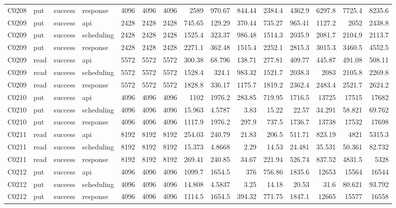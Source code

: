 \begin{landscape}
\begin{longtable}{llllrrrrrrrrrrr}
C0208 & put & success & response & 4096 & 4096 & 4096 & 2589 & 970.67 & 844.44 & 2384.4 & 4362.9 & 6297.8 & 7725.4 & 8235.6\\
C0209 & put & success & api & 2428 & 2428 & 2428 & 745.65 & 129.29 & 370.44 & 735.27 & 965.41 & 1127.2 & 2052 & 2438.8\\
C0209 & put & success & scheduling & 2428 & 2428 & 2428 & 1525.4 & 323.37 & 986.48 & 1514.3 & 2035.9 & 2081.7 & 2104.9 & 2113.7\\
C0209 & put & success & response & 2428 & 2428 & 2428 & 2271.1 & 362.48 & 1515.4 & 2252.1 & 2815.3 & 3015.3 & 3460.5 & 4552.5\\
C0209 & read & success & api & 5572 & 5572 & 5572 & 300.38 & 68.796 & 138.71 & 277.81 & 409.77 & 445.87 & 491.08 & 508.11\\
C0209 & read & success & scheduling & 5572 & 5572 & 5572 & 1528.4 & 324.1 & 983.32 & 1521.7 & 2038.3 & 2083 & 2105.8 & 2269.8\\
C0209 & read & success & response & 5572 & 5572 & 5572 & 1828.8 & 336.17 & 1175.7 & 1819.2 & 2362.4 & 2483.4 & 2521.7 & 2624.2\\
C0210 & put & success & api & 4096 & 4096 & 4096 & 1102 & 1976.2 & 283.85 & 719.95 & 1716.5 & 13725 & 17515 & 17682\\
C0210 & put & success & scheduling & 4096 & 4096 & 4096 & 15.963 & 4.5787 & 3.83 & 15.22 & 22.57 & 34.291 & 58.821 & 69.762\\
C0210 & put & success & response & 4096 & 4096 & 4096 & 1117.9 & 1976.2 & 297.9 & 737.5 & 1736.7 & 13738 & 17532 & 17698\\
C0211 & read & success & api & 8192 & 8192 & 8192 & 254.03 & 240.79 & 21.83 & 206.5 & 511.71 & 823.19 & 4821 & 5315.3\\
C0211 & read & success & scheduling & 8192 & 8192 & 8192 & 15.373 & 4.8668 & 2.29 & 14.53 & 24.481 & 35.531 & 50.361 & 82.732\\
C0211 & read & success & response & 8192 & 8192 & 8192 & 269.41 & 240.85 & 34.67 & 221.94 & 526.74 & 837.52 & 4831.5 & 5328\\
C0212 & put & success & api & 4096 & 4096 & 4096 & 1099.7 & 1654.5 & 376 & 756.86 & 1835.6 & 12653 & 15564 & 16544\\
C0212 & put & success & scheduling & 4096 & 4096 & 4096 & 14.808 & 4.5837 & 3.25 & 14.18 & 20.53 & 31.6 & 80.621 & 93.792\\
C0212 & put & success & response & 4096 & 4096 & 4096 & 1114.5 & 1654.5 & 394.32 & 771.75 & 1847.1 & 12665 & 15577 & 16558\\

\end{longtable}
\end{landscape}
